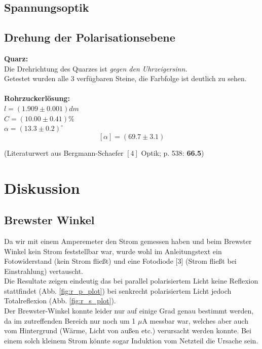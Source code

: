 \documentclass[12pt,a4paper]{article}
\begin{document}
\begin{multicols}{2}
\subsection{Spannungsoptik}




\subsection{Drehung der Polarisationsebene}

\textbf{Quarz:}\\
Die Drehrichtung des Quarzes ist \emph{gegen den Uhrzeigersinn.} \\
Getestet wurden alle 3 verfügbaren Steine, die Farbfolge ist deutlich zu sehen.\\
\\
\textbf{Rohrzuckerlösung:}\\
$l=(1.909\pm 0.001)dm$\\
$C = (10.00 \pm 0.41)\%$\\
$\alpha = (13.3 \pm 0.2)^\circ$
$$[\alpha] = (69.7 \pm 3.1)$$

(Literaturwert aus Bergmann-Schaefer $[4]$ Optik; p. 538: \textbf{66.5})

\section{Diskussion}

\subsection{Brewster Winkel}
Da wir mit einem Amperemeter den Strom gemessen haben und beim Brewster Winkel kein Strom feststellbar war, wurde wohl im Anleitungstext ein Fotowiderstand (kein Strom fließt) und eine Fotodiode [3] (Strom fließt bei Einstrahlung) vertauscht. \\
Die Resultate zeigen eindeutig das bei parallel polarisiertem Licht keine Reflexion stattfindet  (Abb. \ref{fig:r_p_plot}) bei senkrecht polarisiertem Licht jedoch Totalreflexion (Abb. \ref{fig:r_s_plot}). \\
Der Brewster-Winkel konnte leider nur auf einige Grad genau bestimmt werden, da im zutreffenden Bereich nur noch um 1 $\mu$A messbar war, welches aber auch vom Hintergrund (Wärme, Licht von außen etc.) verursacht werden konnte. Bei einem solch kleinem Strom könnte sogar Induktion vom Netzteil die Ursache sein.



\end{multicols}
\end{document}
